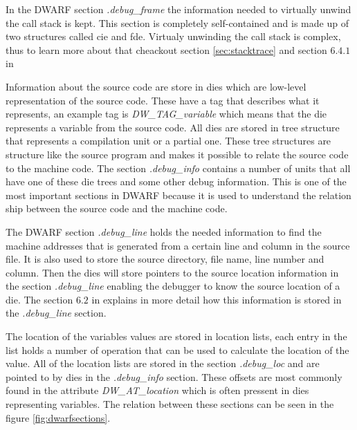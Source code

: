 In the \gls{DWARF} section \emph{.debug\_frame} the information needed to virtually unwind the call stack is kept.
This section is completely self-contained and is made up of two structures called \acrfull{cie} and \acrfull{fde}.
Virtualy unwinding the call stack is complex, thus to learn more about that cheackout section \ref{sec:stacktrace} and  section $6.4.1$ in \cite{dwarf}


Information about the source code are store in \glspl{die} which are low-level representation of the source code.
These have a tag that describes what it represents, an example tag is \emph{DW\_TAG\_variable} which means that the \gls{die} represents a variable from the source code.
All \glspl{die} are stored in \gls{tree} structure that represents a compilation unit or a partial one.
These \gls{tree} structures are structure like the source program and makes it possible to relate the source code to the machine code.
The section \emph{.debug\_info} contains a number of units that all have one of these \gls{die} \glspl{tree} and some other debug information.
This is one of the most important sections in \gls{DWARF} because it is used to understand the relation ship between the source code and the machine code.


The \gls{DWARF} section \emph{.debug\_line} holds the needed information to find the machine addresses that is generated from a certain line and column in the source file.
It is also used to store the source directory, file name, line number and column.
Then the \glspl{die} will store pointers to the source location information in the section \emph{.debug\_line} enabling the debugger to know the source location of a \gls{die}.
The section $6.2$ in \cite{dwarf} explains in more detail how this information is stored in the \emph{.debug\_line} section.


The location of the variables values are stored in location lists, each entry in the list holds a number of operation that can be used to calculate the location of the value.
All of the location lists are stored in the section \emph{.debug\_loc} and are pointed to by \glspl{die} in the \emph{.debug\_info} section.
These offsets are most commonly found in the attribute \emph{DW\_AT\_location} which is often pressent in \glspl{die} representing variables.
The relation between these sections can be seen in the figure \ref{fig:dwarfsections}.


